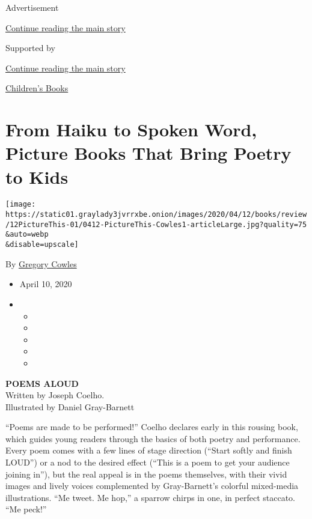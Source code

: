 Advertisement

\protect\hyperlink{after-top}{Continue reading the main story}

Supported by

\protect\hyperlink{after-sponsor}{Continue reading the main story}

\href{/column/childrens-books}{Children's Books}

\hypertarget{from-haiku-to-spoken-word-picture-books-that-bring-poetry-to-kids}{%
\section{From Haiku to Spoken Word, Picture Books That Bring Poetry to
Kids}\label{from-haiku-to-spoken-word-picture-books-that-bring-poetry-to-kids}}

\texttt{[image: https://static01.graylady3jvrrxbe.onion/images/2020/04/12/books/review/12PictureThis-01/0412-PictureThis-Cowles1-articleLarge.jpg?quality=75\\\&auto=webp\\\&disable=upscale]}

By \href{https://www.nytimes3xbfgragh.onion/by/gregory-cowles}{Gregory
Cowles}

\begin{itemize}
\item
  April 10, 2020
\item
  \begin{itemize}
  \item
  \item
  \item
  \item
  \item
  \end{itemize}
\end{itemize}

\textbf{POEMS ALOUD}\\
Written by Joseph Coelho.\\
Illustrated by Daniel Gray-Barnett

``Poems are made to be performed!'' Coelho declares early in this
rousing book, which guides young readers through the basics of both
poetry and performance. Every poem comes with a few lines of stage
direction (``Start softly and finish LOUD'') or a nod to the desired
effect (``This is a poem to get your audience joining in''), but the
real appeal is in the poems themselves, with their vivid images and
lively voices complemented by Gray-Barnett's colorful mixed-media
illustrations. ``Me tweet. Me hop,'' a sparrow chirps in one, in perfect
staccato. ``Me peck!''

